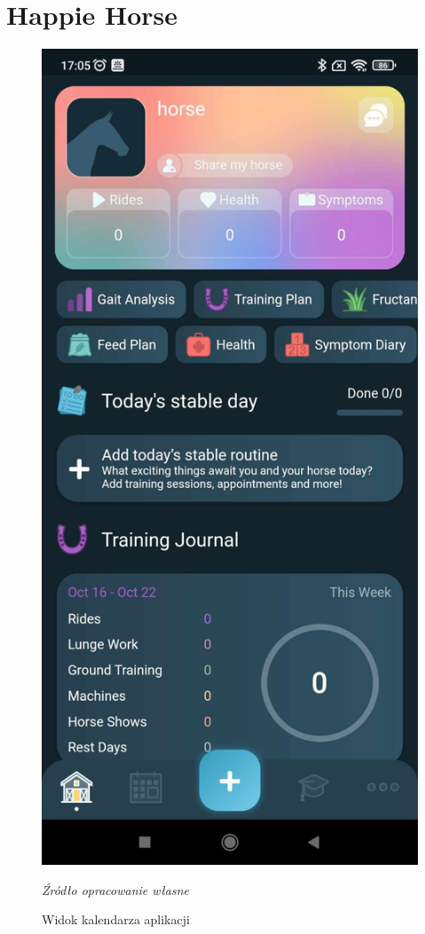 \documentclass[12pt,oneside]{report}
\begin{document}
\section{Happie Horse}
\begin{figure}
	\centering
	\includegraphics[scale=0.15]{happieHorse1}
	\caption{Widok kalendarza aplikacji}
	\textit{Źródło opracowanie własne}
	\label{HappieHorse}
\end{figure}
\end{document}
